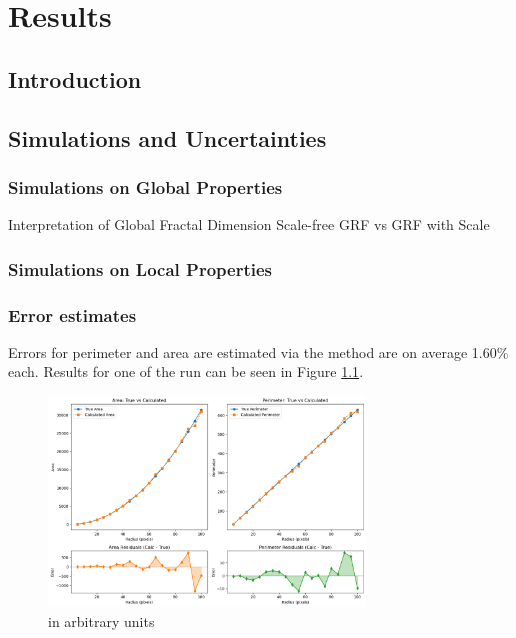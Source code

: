 \chapter{Results}
\label{ch:results}

\section{Introduction}

\section{Simulations and Uncertainties}

\subsection{Simulations on Global Properties}
Interpretation of Global Fractal Dimension
Scale-free GRF vs GRF with Scale

\subsection{Simulations on Local Properties}

\subsection{Error estimates}

Errors for perimeter and area are estimated via the method are on average 1.60\% each. Results for one of the run can be seen in Figure \ref{fig:uncertainties}.

\begin{figure}[t]
    \centering
    \includegraphics[width=0.75\textwidth]{figures/perimeter_area_uncertainties.png}
    \caption{in arbitrary units }
    \label{fig:uncertainties}
\end{figure}

